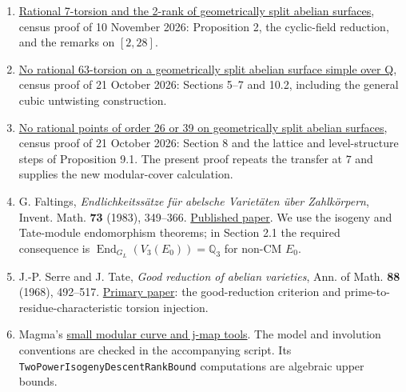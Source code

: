 \documentclass[
  11pt,
]{article}
\providecommand{\tightlist}{%
  \setlength{\itemsep}{0pt}\setlength{\parskip}{0pt}}
\begin{document}
\begin{enumerate}
\def\labelenumi{\arabic{enumi}.}
\tightlist
\item
  \href{https://genus-2-torsion.github.io/proofs/qsimple-2214-obstruction.html}{Rational
  7-torsion and the 2-rank of geometrically split abelian surfaces},
  census proof of 10 November 2026: Proposition 2, the cyclic-field
  reduction, and the remarks on \([2,28]\).
\item
  \href{https://genus-2-torsion.github.io/proofs/qsimple-63-obstruction.html}{No
  rational 63-torsion on a geometrically split abelian surface simple
  over Q}, census proof of 21 October 2026: Sections 5--7 and 10.2,
  including the general cubic untwisting construction.
\item
  \href{https://genus-2-torsion.github.io/proofs/geometric-26-39-obstruction.html}{No
  rational points of order 26 or 39 on geometrically split abelian
  surfaces}, census proof of 21 October 2026: Section 8 and the lattice
  and level-structure steps of Proposition 9.1. The present proof
  repeats the transfer at \(7\) and supplies the new modular-cover
  calculation.
\item
  G. Faltings, \emph{Endlichkeitssätze für abelsche Varietäten über
  Zahlkörpern}, Invent. Math. \textbf{73} (1983), 349--366.
  \href{https://doi.org/10.1007/BF01388432}{Published paper}. We use the
  isogeny and Tate-module endomorphism theorems; in Section 2.1 the
  required consequence is
  \(\operatorname{End}_{G_L}(V_3(E_0))=\mathbb Q_3\) for non-CM \(E_0\).
\item
  J.-P. Serre and J. Tate, \emph{Good reduction of abelian varieties},
  Ann. of Math. \textbf{88} (1968), 492--517.
  \href{https://doi.org/10.2307/1970722}{Primary paper}: the
  good-reduction criterion and prime-to-residue-characteristic torsion
  injection.
\item
  Magma's
  \href{https://magma.maths.usyd.edu.au/magma/handbook/modular_curves}{small
  modular curve and j-map tools}. The model and involution conventions
  are checked in the accompanying script. Its
  \texttt{TwoPowerIsogenyDescentRankBound} computations are algebraic
  upper bounds.
\end{enumerate}
\end{document}
